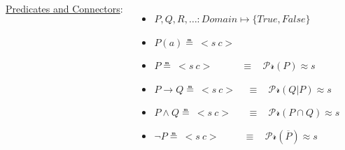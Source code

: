 \documentclass[aspectratio=169]{beamer}
\newcommand{\TTrue}{\textit{True}}
\newcommand{\TFalse}{\textit{False}}
\newcommand{\prob}[1]{\mathcal{Pr}\left(#1\right)}
\begin{document}
\begin{frame}


  \begin{columns}
    \column{7.8cm}

    \underline{Predicates and Connectors}:
    \begin{itemize}
    \item<+-> $P, Q, R, \hdots: \textit{Domain} \mapsto \{\TTrue, \TFalse\}$
    \item<+-> $P(a) \measeq\ <\!s\ c\!>$
    \item<+-> $P \measeq\ <\!s\ c\!> \ \ \ \ \ \ \ \ \ \ \ \ \ \equiv \ \ \ \ \prob{P} \approx s$
    \item<+-> $P \rightarrow Q \measeq\ <\!s\ c\!> \ \ \ \ \ \equiv \ \ \
      \ \prob{Q|P} \approx s$
    \item<+-> $P \land Q \measeq\ <\!s\ c\!> \ \ \ \ \ \ \ \! \equiv \
      \ \ \ \prob{P \cap Q} \approx s$
    \item<+-> $\lnot P \measeq\ <\!s\ c\!> \ \ \ \ \ \ \ \ \ \ \! \
      \equiv \ \ \ \ \prob{\overline{P}} \approx s$
    \end{itemize}


\end{columns}
\end{frame}
\end{document}
